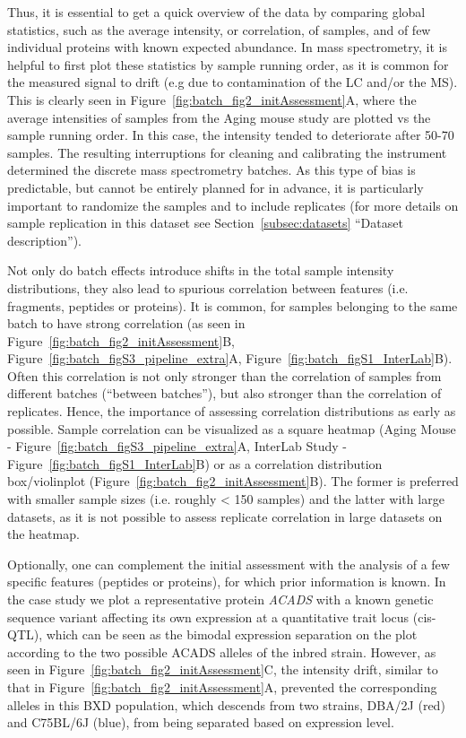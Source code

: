 \documentclass[num-refs]{wiley-article}
\begin{document}
Thus, it is essential to get a quick overview of the data by comparing global statistics, such as the average intensity, or correlation, of samples, and of few individual proteins with known expected abundance. In mass spectrometry, it is helpful to first plot these statistics by sample running order, as it is common for the measured signal to drift (e.g  due to contamination of the LC and/or the MS). This is clearly seen in Figure~\ref{fig:batch_fig2_initAssessment}A, where the average intensities of samples from the Aging mouse study are plotted vs the sample running order. In this case, the intensity tended to deteriorate after 50-70 samples. The resulting interruptions for cleaning and calibrating the instrument determined the discrete mass spectrometry batches. As this type of bias is predictable, but cannot be entirely planned for in advance, it is particularly important to randomize the samples and to include replicates (for more details on sample replication in this dataset see Section~\ref{subsec:datasets} “Dataset description”). 

Not only do batch effects introduce shifts in the total sample intensity distributions, they also lead to spurious correlation between features (i.e. fragments, peptides or proteins). It is common, for samples belonging to the same batch to have strong correlation (as seen in Figure~\ref{fig:batch_fig2_initAssessment}B, Figure~\ref{fig:batch_figS3_pipeline_extra}A, Figure~\ref{fig:batch_figS1_InterLab}B). Often this correlation is not only stronger than the correlation of samples from different batches (“between batches”), but also stronger than the correlation of replicates. Hence, the importance of assessing correlation distributions as early as possible. Sample correlation can be visualized as a square heatmap (Aging Mouse - Figure~\ref{fig:batch_figS3_pipeline_extra}A, InterLab Study -  Figure~\ref{fig:batch_figS1_InterLab}B) or as a correlation distribution box/violinplot (Figure~\ref{fig:batch_fig2_initAssessment}B). The former is preferred with smaller sample sizes (i.e. roughly < 150 samples) and the latter with large datasets, as it is not possible to assess replicate correlation in large datasets on the heatmap.

Optionally, one can complement the initial assessment with the analysis of a few specific features (peptides or proteins), for which prior information is known. In the case study we plot a representative protein \textit{ACADS} with a known genetic sequence variant affecting its own expression at a quantitative trait locus (cis-QTL), which can be seen as the bimodal expression separation on the plot according to the two possible ACADS alleles of the inbred strain. However, as seen in Figure~\ref{fig:batch_fig2_initAssessment}C, the intensity drift, similar to that in Figure~\ref{fig:batch_fig2_initAssessment}A, prevented the corresponding alleles in this BXD population, which descends from two strains, DBA/2J (red) and C75BL/6J (blue), from being separated based on expression level.
\end{document}

